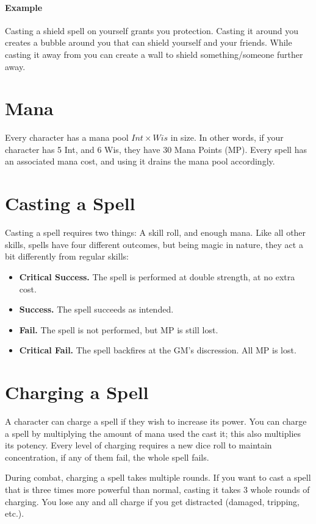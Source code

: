 \paragraph{Example} Casting a shield spell on yourself grants you protection.
Casting it around you creates a bubble around you that can shield yourself and your friends.
While casting it away from you can create a wall to shield something/someone further away.

\section{Mana}
Every character has a mana pool $Int \times Wis$ in size.
In other words, if your character has 5 Int, and 6 Wis, they have 30 Mana Points (MP).
Every spell has an associated mana cost, and using it drains the mana pool accordingly.

\section{Casting a Spell}
Casting a spell requires two things: A skill roll, and enough mana.
Like all other skills, spells have four different outcomes, but being magic in nature, they act a bit differently from regular skills:
\begin{itemize}
\item \textbf{Critical Success.} The spell is performed at double strength, at no extra cost.
\item \textbf{Success.} The spell succeeds as intended.
\item \textbf{Fail.} The spell is not performed, but MP is still lost.
\item \textbf{Critical Fail.} The spell backfires at the GM's discression. All MP is lost.
\end{itemize}

\section{Charging a Spell}
A character can charge a spell if they wish to increase its power.
You can charge a spell by multiplying the amount of mana used the cast it;
this also multiplies its potency.
Every level of charging requires a new dice roll to maintain concentration, if any of them fail, the whole spell fails.

During combat, charging a spell takes multiple rounds.
If you want to cast a spell that is three times more powerful than normal, casting it takes 3 whole rounds of charging.
You lose any and all charge if you get distracted (damaged, tripping, etc.).

